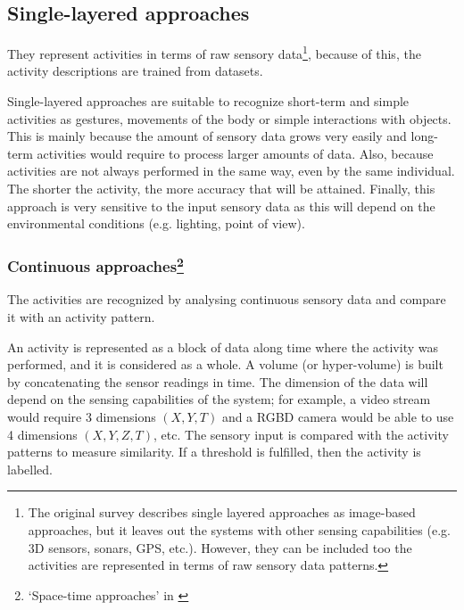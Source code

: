 \subsection{Single-layered approaches}
They represent activities in terms of raw sensory data\footnote{The original survey \citep{Aggarwal11_HumanActivity} describes single layered approaches as image-based approaches, but it leaves out the systems with other sensing capabilities (e.g. 3D sensors, sonars, GPS, etc.).
However, they can be included too the activities are represented in terms of raw sensory data patterns.}, because of this, the activity descriptions are trained from datasets.


Single-layered approaches are suitable to recognize short-term and simple activities as gestures, movements of the body or simple interactions with objects. 
This is mainly because the amount of sensory data grows very easily and long-term activities would require to process larger amounts of data. 
Also, because activities are not always performed in the same way, even by the same individual.
The shorter the activity, the more accuracy that will be attained.
Finally, this approach is very sensitive to the input sensory data as this will depend on the environmental conditions (e.g. lighting, point of view).


\subsubsection{Continuous approaches\footnote{`Space-time approaches' in \citep{Aggarwal11_HumanActivity}}} %

The activities are recognized by analysing continuous sensory data and compare it with an activity pattern.

An activity is represented as a block of data along time where the activity was performed, and it is considered as a whole.
A volume (or hyper-volume) is built by concatenating the sensor readings in time.
The dimension of the data will depend on the sensing capabilities of the system; for example, a video stream would require 3 dimensions $(X,Y,T)$ and a RGBD camera would be able to use 4 dimensions $(X,Y,Z,T)$, etc. %
The sensory input is compared with the activity patterns to measure similarity.
If a threshold is fulfilled, then the activity is labelled.


